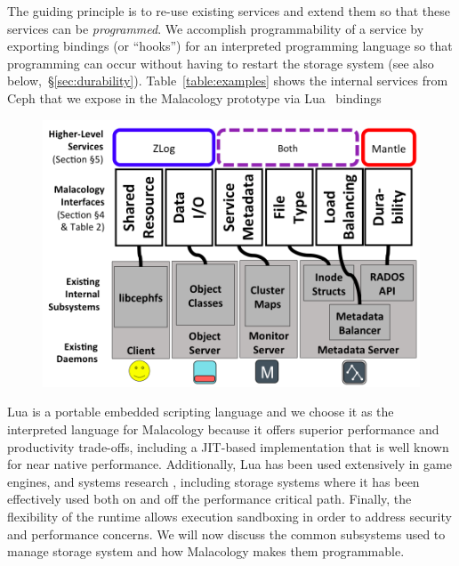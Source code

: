 The guiding principle is to re-use existing services and extend them so that
these services can be \emph{programmed}. We accomplish programmability of a
service by exporting bindings (or ``hooks'') for an interpreted programming
language so that programming can occur without having to restart the storage
system (see also below,~\S\ref{sec:durability}). Table~\ref{table:examples}
shows the internal services from Ceph that we expose in the Malacology
prototype via Lua~\cite{ierusalimschy1996lua} bindings
 

\begin{figure}[tbp]
\centering
\includegraphics{figures/implementation-overview.png}
\caption{
\label{fig:implementation-overview}}
\end{figure}

Lua is a portable embedded scripting language and we choose it as the
interpreted language for Malacology because it offers superior performance and
productivity trade-offs, including a JIT-based implementation that is well
known for near native performance. Additionally, Lua has been used extensively
in game engines, and systems research \cite{neto:dls14-luaos}, including
storage systems where it has been effectively used both on
\cite{grawinkel:pdsw2012-lua,watkins2013:bdmc13-in-vivo,geambasu_comet_2010}
and off \cite{sevilla:sc15-mantle} the performance critical path. Finally, the
flexibility of the runtime allows execution sandboxing in order to address
security and performance concerns. We will now discuss the common subsystems
used to manage storage system and how Malacology makes them programmable.

